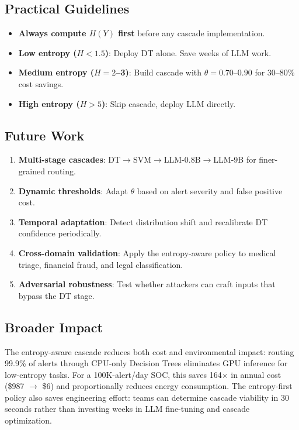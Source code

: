 \documentclass[review,3p]{elsarticle}
\begin{document}
\subsection{Practical Guidelines}
\begin{itemize}
\item \textbf{Always compute $H(Y)$ first} before any cascade implementation.
\item \textbf{Low entropy ($H<1.5$)}: Deploy DT alone. Save weeks of LLM work.
\item \textbf{Medium entropy ($H=2$--3)}: Build cascade with $\theta=0.70$--$0.90$ for 30--80\% cost savings.
\item \textbf{High entropy ($H>5$)}: Skip cascade, deploy LLM directly.
\end{itemize}

\subsection{Future Work}
\begin{enumerate}
\item \textbf{Multi-stage cascades}: DT$\to$SVM$\to$LLM-0.8B$\to$LLM-9B for finer-grained routing.
\item \textbf{Dynamic thresholds}: Adapt $\theta$ based on alert severity and false positive cost.
\item \textbf{Temporal adaptation}: Detect distribution shift and recalibrate DT confidence periodically.
\item \textbf{Cross-domain validation}: Apply the entropy-aware policy to medical triage, financial fraud, and legal classification.
\item \textbf{Adversarial robustness}: Test whether attackers can craft inputs that bypass the DT stage.
\end{enumerate}

\subsection{Broader Impact}
The entropy-aware cascade reduces both cost and environmental impact: routing 99.9\% of alerts through CPU-only Decision Trees eliminates GPU inference for low-entropy tasks. For a 100K-alert/day SOC, this saves 164$\times$ in annual cost (\$987 $\to$ \$6) and proportionally reduces energy consumption. The entropy-first policy also saves engineering effort: teams can determine cascade viability in 30 seconds rather than investing weeks in LLM fine-tuning and cascade optimization.
\end{document}
